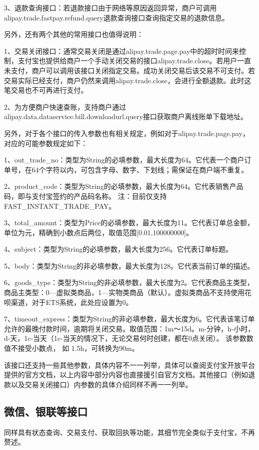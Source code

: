 3、退款查询接口：若退款接口由于网络等原因返回异常，商户可调用alipay.trade.fastpay.refund.query退款查询接口查询指定交易的退款信息。

另外，还有两个其他的常用接口也值得说明：

1、交易关闭接口：通常交易关闭是通过alipay.trade.page.pay中的超时时间来控制，支付宝也提供给商户一个手动关闭交易的接口alipay.trade.close。若用户一直未支付，商户可以调用该接口关闭指定交易。成功关闭交易后该交易不可支付。若交易实际已经支付，商户仍然来调用alipay.trade.close，会进行全额退款。此时这笔交易也不可再进行支付。

2、为方便商户快速查账，支持商户通过alipay.data.dataservice.bill.downloadurl.query接口获取商户离线账单下载地址。

另外，对于各个接口的传入参数也有相关规定，例如对于alipay.trade.page.pay，对应的可能参数规定如下：

1、out\_trade\_no：类型为String的必填参数，最大长度为64。它代表一个商户订单号，在64个字符以内，可包含字母、数字、下划线；需保证在商户端不重复。

2、product\_code：类型为String的必填参数，最大长度为64。它代表销售产品码，即与支付宝签约的产品码名称。 注：目前仅支持
FAST\_INSTANT\_TRADE\_PAY。

3、total\_amount：类型为Price的必填参数，最大长度为11。它代表订单总金额，单位为元，精确到小数点后两位，取值范围[0.01,100000000]。

4、subject：类型为String的必填参数，最大长度为256。它代表订单标题。

5、body：类型为String的非必填参数，最大长度为128。它代表当前订单的描述。

6、goods\_type：类型为String的非必填参数，最大长度为2。它代表商品主类型，商品主类型：0—虚拟类商品，1—实物类商品（默认）。虚拟类商品不支持使用花呗渠道，对于ETS系统，此处应设置为0。

7、timeout\_express：类型为String的非必填参数，最大长度为6。它代表该笔订单允许的最晚付款时间，逾期将关闭交易。取值范围：1m～15d。m-分钟，h-小时，d-天，1c-当天（1c-当天的情况下，无论交易何时创建，都在0点关闭）。 该参数数值不接受小数点， 如 1.5h，可转换为90m。

该接口还支持一些其他参数，具体内容不一一列举，具体可以查阅支付宝开放平台提供的官方文档，以上内容中部分内容也直接援引自官方文档。其他接口（例如退款以及交易关闭接口）内参数的具体介绍同样不再一一列举。

\subsection{微信、银联等接口}
同样具有状态查询、交易支付、获取回执等功能，其细节完全类似于支付宝，不再赘述。

